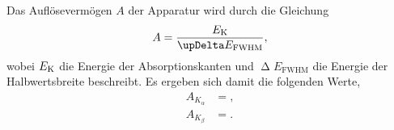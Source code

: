 Das Auflösevermögen $A$ der Apparatur wird durch die Gleichung
\begin{align*}
  A = \frac{E_{\text K}}{\upDelta E_{\text{FWHM}}},
\end{align*}
wobei $E_{\text K}$ die Energie der Absorptionskanten und $\upDelta E_{\text{FWHM}}$ die Energie der Halbwertsbreite beschreibt.
Es ergeben sich damit die folgenden Werte,
\begin{align*}
  A_{K_\alpha} &= ,\\
  A_{K_\beta} &= .
\end{align*}